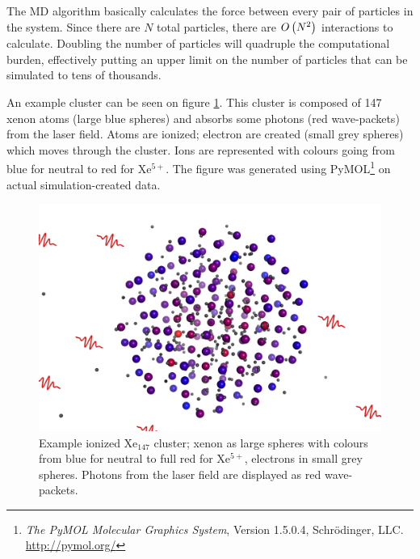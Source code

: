 The MD algorithm basically calculates the force between every pair of particles
in the system. Since there are $N$ total particles, there are $O\left( N^2 \right)$
interactions to calculate. Doubling the number of particles will quadruple the
computational burden, effectively putting an upper limit on the number of
particles that can be simulated to tens of thousands.

An example cluster can be seen on figure \ref{fig:md:cluster}.
This cluster is composed
of 147 xenon atoms (large blue spheres) and absorbs some photons (red
wave-packets) from the laser field. Atoms are ionized; electron are created
(small grey spheres) which moves through the cluster. Ions are represented with
colours going from blue for neutral to red for Xe$^{5+}$. The figure was
generated using
PyMOL\footnote{\textit{The PyMOL Molecular Graphics System}, Version 1.5.0.4,
Schrödinger, LLC. \url{http://pymol.org/}} on actual simulation-created data.


\begin{figure}
 \centering
 \includegraphics[width=\figurewidth]{figures/cluster}
 \caption{\label{fig:md:cluster}Example ionized Xe$_{147}$ cluster; xenon as
          large spheres with colours from blue for neutral to full red for
          Xe$^{5+}$, electrons in small grey spheres. Photons from the laser
          field are displayed as red wave-packets.}
\end{figure}

